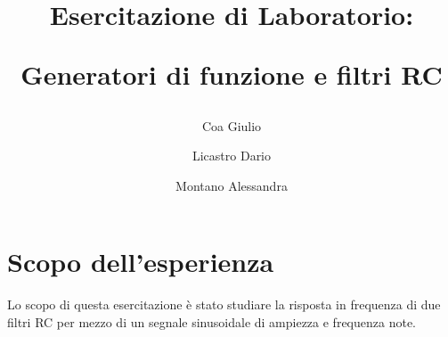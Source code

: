 \documentclass[a4paper]{article}
\title{
		\begin{center}
			Esercitazione di Laboratorio:
		\end{center}
		\newline
		\begin{center}
			Generatori di funzione e filtri RC
		\end{center}
	}
\author{
			Coa Giulio
			\and
			Licastro Dario
			\and
			Montano Alessandra
		}
\begin{document}
	\begin{titlingpage}
		\maketitle
	\end{titlingpage}
	\newpage
	\section{Scopo dell'esperienza}
		Lo scopo di questa esercitazione è stato studiare la risposta in frequenza di due filtri RC per mezzo di un segnale sinusoidale di ampiezza e frequenza note.
\end{document}
